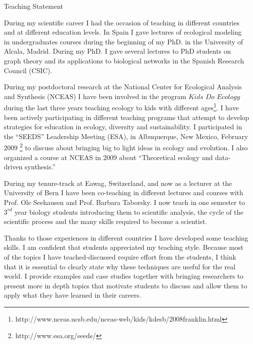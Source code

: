 \documentclass[a4paper,12pt]{article}
\begin{document}
{\Large Teaching Statement} 

\vspace{0.25 in} During my scientific career I had the occasion of
teaching in different countries and at different education levels. In
Spain I gave lectures of ecological modeling in undergraduates courses
during the beginning of my PhD. in the University of Alcala,
Madrid. During my PhD. I gave several lectures to PhD students on
graph theory and its applications to biological networks in the
Spanish Research Council (CSIC).

During my postdoctoral research at the National Center for Ecological
Analysis and Synthesis (NCEAS) I have been involved in the program
$Kids$ $Do$ $Ecology$ during the last three years teaching ecology to
kids with different
ages\footnote{http://www.nceas.ucsb.edu/nceas-web/kids/kdesb/2008franklin.html}. I
have been actively participating in different teaching programs that
attempt to develop strategies for education in ecology, diversity and
sustainability. I participated in the ``SEEDS'' Leadership Meeting
(ESA), in Albuquerque, New Mexico, February 2009
\footnote{http://www.esa.org/seeds/} to discuss about bringing big to
light ideas in ecology and evolution. I also organized a course at
NCEAS in 2009 about ``Theoretical ecology and data-driven synthesis.''

During my tenure-track at Eawag, Switzerland, and now as a lecturer at
the University of Bern I have been co-teaching in different lectures
and courses with Prof. Ole Seehausen and Prof. Barbara Taborsky. I now
teach in one semester to $3^{rd}$ year biology students introducing
them to scientific analysis, the cycle of the scientific process and
the many skills required to become a scientist.

Thanks to those experiences in different countries I have developed
some teaching skills. I am confident that students appreciated my
teaching style. Because most of the topics I have teached-discussed
require effort from the students, I think that it is essential to
clearly state why these techniques are useful for the real world. I
provide examples and case studies together with bringing researchers
to present more in depth topics that motivate students to discuss and
allow them to apply what they have learned in their careers.
\newpage
\end{document}
